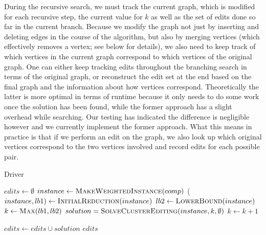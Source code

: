 \documentclass[12pt,oneside,english,parskip=full,headings=small]{scrbook}
\theoremstyle{definition}
\begin{document}
During the recursive search, we must track the current graph, which is modified for each recursive
step, the current value for $k$ as well as the set of edits done so far in the current branch.
Because we modify the graph not just by inserting and deleting edges in the course of the algorithm,
but also by merging vertices (which effectively removes a vertex; see below for details), we also
need to keep track of which vertices in the current graph correspond to which vertices of the
original graph. One can either keep tracking edits throughout the branching search in terms of the
original graph, or reconstruct the edit set at the end based on the final graph and the information
about how vertices correspond. Theoretically the latter is more optimal in terms of runtime because
it only needs to do some work once the solution has been found, while the former approach has a
slight overhead while searching. Our testing has indicated the difference is negligible however and
we currently implement the former approach. What this means in practice is that if we perform an
edit on the graph, we also look up which original vertices correspond to the two vertices involved
and record edits for each possible pair.

\begin{algorithm}[h]
\caption{Driver}
\label{alg:driver}
\begin{algorithmic}

	\State $edits \gets \emptyset$
		\State $instance \gets \Call{MakeWeightedInstance}{comp}$
		\State ($instance, lb1) \gets \Call{InitialReduction}{instance}$
		\State $lb2 \gets \Call{LowerBound}{instance}$
		\State $k \gets \Call{Max}{lb1, lb2}$
		\Repeat
			\State $solution = \Call{SolveClusterEditing}{instance, k, \emptyset}$
			\State $k \gets k + 1$

		\State $edits \gets edits \cup solution$
	\EndFor
	\State \Return $edits$
\EndFunction

\end{algorithmic}
\end{algorithm}
\end{document}
